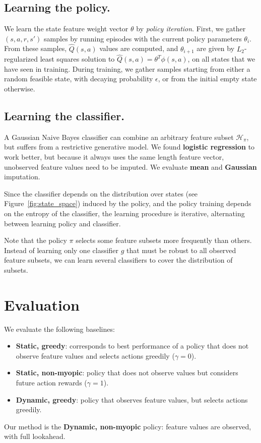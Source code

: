\subsection{Learning the policy.}
We learn the state feature weight vector $\theta$ by \emph{policy iteration}.
First, we gather $(s, a, r, s')$ samples by running episodes with the current policy parameters $\theta_i$.
From these samples, $\hat{Q}(s, a)$ values are computed, and $\theta_{i+1}$ are given by $L_2$-regularized least squares solution to $\hat{Q}(s, a) = \theta^T \phi(s, a)$, on all states that we have seen in training.
During training, we gather samples starting from either a random feasible state, with decaying probability $\epsilon$, or from the initial empty state otherwise.

\subsection{Learning the classifier.}\label{sec:classifier}

A Gaussian Naive Bayes classifier can combine an arbitrary feature subset $\mathcal{H}_\pi$, but suffers from a restrictive generative model.
We found \textbf{logistic regression} to work better, but because it always uses the same length feature vector, unobserved feature values need to be imputed.
We evaluate \textbf{mean} and \textbf{Gaussian} imputation.

Since the classifier depends on the distribution over states (see Figure~\ref{fig:state_space}) induced by the policy, and the policy training depends on the entropy of the classifier, the learning procedure is iterative, alternating between learning policy and classifier.

Note that the policy $\pi$ selects some feature subsets more frequently than others.
Instead of learning only one classifier $g$ that must be robust to all observed feature subsets, we can learn several classifiers to cover the distribution of subsets.

\section{Evaluation}
We evaluate the following baselines:
\vspace{-1em}
\begin{itemize}\addtolength{\itemsep}{-.55\baselineskip}
\item \textbf{Static, greedy}: corresponds to best performance of a policy that does not observe feature values and selects actions greedily ($\gamma=0$).
\item \textbf{Static, non-myopic}: policy that does not observe values but considers future action rewards ($\gamma=1$).
\item \textbf{Dynamic, greedy}: policy that observes feature values, but selects actions greedily.
\end{itemize}
\vspace{-1em}
Our method is the \textbf{Dynamic, non-myopic} policy: feature values are observed, with full lookahead.


